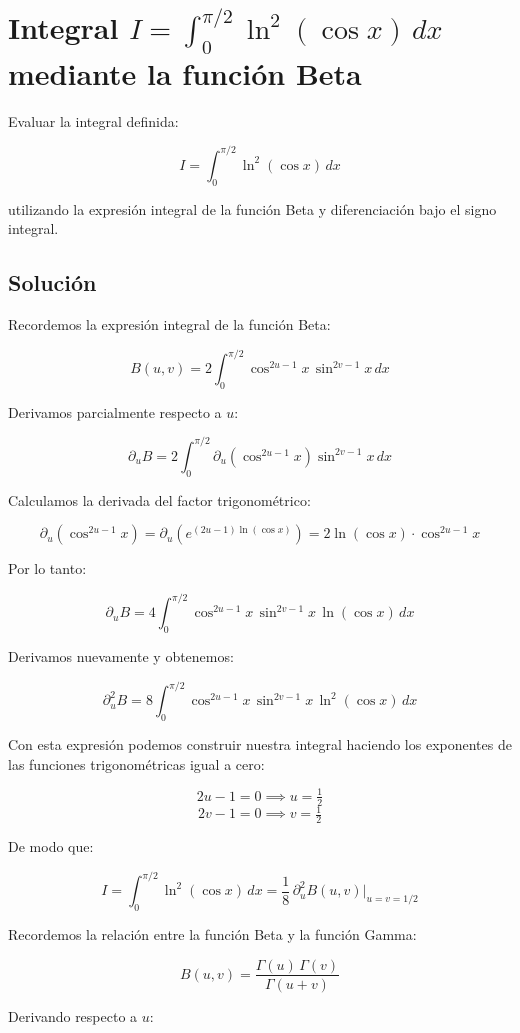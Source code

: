 \documentclass[a4paper]{article}
\begin{document}
\tableofcontents

\section{Integral $I = \int_0^{\pi/2} \ln^2(\cos x)\, dx$ mediante la función Beta}

Evaluar la integral definida:

$$I = \int_0^{\pi/2} \ln^2(\cos x)\, dx$$

utilizando la expresión integral de la función Beta y diferenciación bajo el signo integral.

\subsection{Solución}

Recordemos la expresión integral de la función Beta:

$$B(u,v) = 2\int_0^{\pi/2} \cos^{2u-1}x\, \sin^{2v-1}x\, dx$$

Derivamos parcialmente respecto a $u$:

$$\partial_u B = 2\int_0^{\pi/2} \partial_u\!\left(\cos^{2u-1}x\right) \sin^{2v-1}x\, dx$$

Calculamos la derivada del factor trigonométrico:

$$\partial_u\!\left(\cos^{2u-1}x\right) = \partial_u\!\left(e^{(2u-1)\ln(\cos x)}\right) = 2\ln(\cos x)\cdot \cos^{2u-1}x$$

Por lo tanto:

$$\partial_u B = 4\int_0^{\pi/2} \cos^{2u-1}x\, \sin^{2v-1}x\, \ln(\cos x)\, dx$$

Derivamos nuevamente y obtenemos:

$$\partial_u^2 B = 8\int_0^{\pi/2} \cos^{2u-1}x\, \sin^{2v-1}x\, \ln^2(\cos x)\, dx$$

Con esta expresión podemos construir nuestra integral haciendo los exponentes de las funciones trigonométricas igual a cero:

$$2u - 1 = 0 \implies u = \tfrac{1}{2}$$
$$2v - 1 = 0 \implies v = \tfrac{1}{2}$$

De modo que:

$$I = \int_0^{\pi/2} \ln^2(\cos x)\, dx = \frac{1}{8}\,\partial_u^2 B(u,v)\Big|_{u=v=1/2}$$

Recordemos la relación entre la función Beta y la función Gamma:

$$B(u,v) = \frac{\Gamma(u)\,\Gamma(v)}{\Gamma(u+v)}$$

Derivando respecto a $u$:
\end{document}
